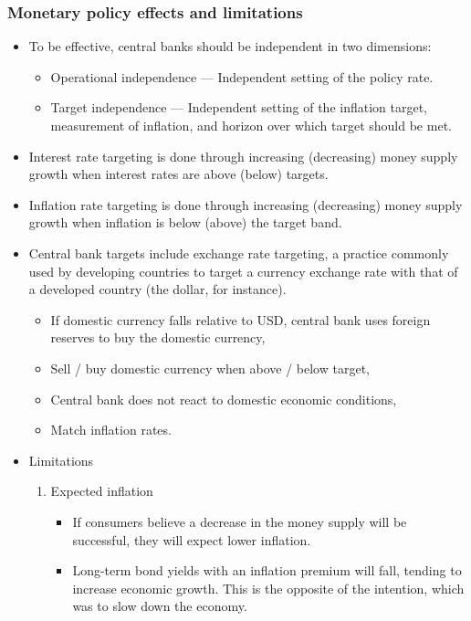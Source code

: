 \documentclass[../notes_compiled.tex]{subfiles}
\begin{document}
\subsubsection{Monetary policy effects and limitations}
\begin{itemize}
\item To be effective, central banks should be independent in two dimensions:
\begin{itemize}
\item Operational independence --- Independent setting of the policy rate.
\item Target independence --- Independent setting of the inflation target, measurement of inflation, and horizon over which target should be met.
\end{itemize}
\item Interest rate targeting is done through increasing (decreasing) money supply growth when interest rates are above (below) targets.
\item Inflation rate targeting is done through increasing (decreasing) money supply growth when inflation is below (above) the target band.
\item Central bank targets include exchange rate targeting, a practice commonly used by developing countries to target a currency exchange rate with that of a developed country (the dollar, for instance).
\begin{itemize}
\item If domestic currency falls relative to USD, central bank uses foreign reserves to buy the domestic currency,
\item Sell / buy domestic currency when above / below target,
\item Central bank does not react to domestic economic conditions,
\item Match inflation rates.
\end{itemize}
\item Limitations
\begin{enumerate}
\item Expected inflation
\begin{itemize}
\item If consumers believe a decrease in the money supply will be successful, they will expect lower inflation.
\item Long-term bond yields with an inflation premium will fall, tending to increase economic growth. This is the opposite of the intention, which was to slow down the economy.
\end{itemize}

\end{enumerate}
\end{itemize}
\end{document}
